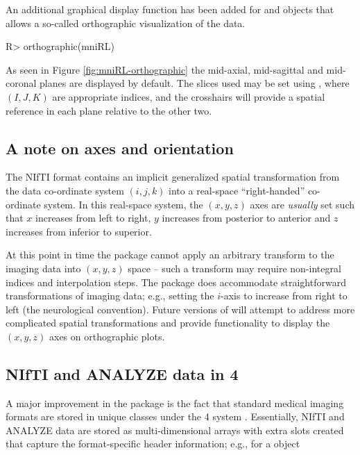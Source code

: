 \documentclass[
]{jss}
\begin{document}
An additional graphical display function has been added for 
and  objects that allows a so-called orthographic
visualization of the data.

\begin{CodeChunk}

\begin{CodeInput}
R> orthographic(mniRL)
\end{CodeInput}
\end{CodeChunk}

As seen in Figure \ref{fig:mniRL-orthographic} the mid-axial,
mid-sagittal and mid-coronal planes are displayed by default. The slices
used may be set using , where \((I,J,K)\) are
appropriate indices, and the crosshairs will provide a spatial reference
in each plane relative to the other two.

\subsection{A note on axes and orientation}

The NIfTI format contains an implicit generalized spatial transformation
from the data co-ordinate system \((i,j,k)\) into a real-space
``right-handed'' co-ordinate system. In this real-space system, the
\((x,y,z)\) axes are \emph{usually} set such that \(x\) increases from
left to right, \(y\) increases from posterior to anterior and \(z\)
increases from inferior to superior.

At this point in time the  package cannot apply an
arbitrary transform to the imaging data into \((x,y,z)\) space -- such a
transform may require non-integral indices and interpolation steps. The
package does accommodate straightforward transformations of imaging
data; e.g., setting the \(i\)-axis to increase from right to left (the
neurological convention). Future versions of  will
attempt to address more complicated spatial transformations and provide
functionality to display the \((x,y,z)\) axes on orthographic plots.

\subsection[NIfTI and ANALYZE data in S4]{NIfTI and ANALYZE data in 4}

A major improvement in the  package is the fact that
standard medical imaging formats are stored in unique classes under the
4 system \citep{chambers:2008}. Essentially, NIfTI and
ANALYZE data are stored as multi-dimensional arrays with extra slots
created that capture the format-specific header information; e.g., for a
 object
\end{document}
